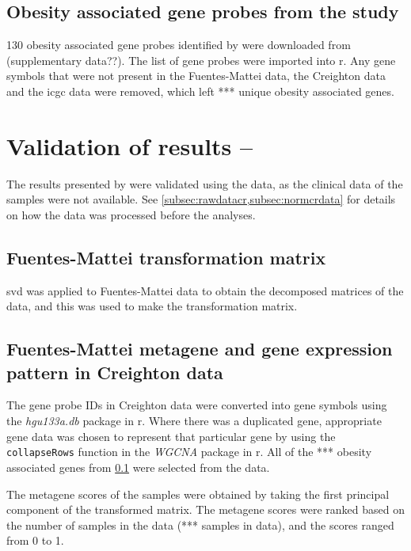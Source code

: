 \subsection{Obesity associated gene probes from the \citet{Fuentes-Mattei2014} study}
\label{subsec:fmobsgene}

130 obesity associated gene probes identified by \citet{Fuentes-Mattei2014} were downloaded from (supplementary data??).
The list of gene probes were imported into \gls{r}.
Any gene symbols that were not present in the Fuentes-Mattei data, the Creighton data and the \gls{icgc} data were removed, which left *** unique obesity associated genes.

\section{Validation of results -- \citet{Fuentes-Mattei2014}}
\label{sec:valresultsfm}

The results presented by \citet{Fuentes-Mattei2014} were validated using the \citet{Creighton2012} data, as the clinical data of the samples were not available.
See \cref{subsec:rawdatacr,subsec:normcrdata} for details on how the data was processed before the analyses.

\subsection{Fuentes-Mattei transformation matrix}
\label{subsec:transmatfm}

\gls{svd} was applied to Fuentes-Mattei data to obtain the decomposed matrices of the data, and this was used to make the transformation matrix.

\subsection{Fuentes-Mattei metagene and gene expression pattern in Creighton data}
\label{subsec:fmmetage}

The gene probe IDs in Creighton data were converted into gene symbols using the \textit{hgu133a.db} package in \gls{r}.
Where there was a duplicated gene, appropriate gene data was chosen to represent that particular gene by using the \texttt{collapseRows} function in the \textit{WGCNA} package in \gls{r}.
All of the *** obesity associated genes from  \cref{subsec:fmobsgene} were selected from the data.

The \gls{metagene} scores of the samples were obtained by taking the first principal component of the transformed matrix.
The \gls{metagene} scores were ranked based on the number of samples in the data (*** samples in \citet{Creighton2012} data), and the scores ranged from 0 to 1.

